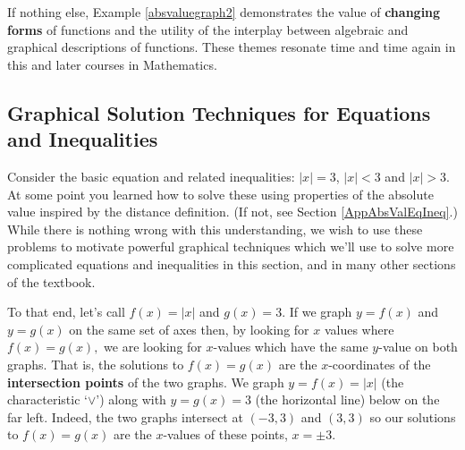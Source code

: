 \documentclass{ximera}
\begin{document}
If nothing else, Example \ref{absvaluegraph2} demonstrates the value of \textbf{changing forms} of functions and the utility of the interplay between algebraic and graphical descriptions of functions.  These themes resonate time and time again in this and later courses in Mathematics.  

\subsection{Graphical Solution Techniques for Equations and Inequalities}
\label{EquationsInequalitiesGraphically}

Consider the basic equation and related inequalities: $|x| = 3$, $|x| < 3$ and $|x| > 3$.  At some point you learned  how to solve these using properties of the absolute value inspired by the distance definition. (If not, see Section \ref{AppAbsValEqIneq}.)   While there is nothing wrong with this understanding, we wish to use these problems to motivate powerful graphical techniques which we'll use to solve more complicated equations and inequalities in this section, and in many other sections of the textbook.    

\medskip

To that end, let's call $f(x)  = |x|$ and $g(x) = 3$. If we graph $y = f(x)$ and $y = g(x)$ on the same set of axes then, by looking for $x$ values where $f(x) = g(x),$ we are looking for $x$-values which have the same $y$-value on both graphs. That is, the solutions to $f(x) = g(x)$ are the $x$-coordinates of the \textbf{intersection points} of the two graphs.  We graph $y = f(x) = |x|$ (the characteristic `$\vee$') along with $y = g(x) = 3$ (the horizontal line) below on the far left.  Indeed, the two graphs intersect at $(-3, 3)$ and $(3, 3)$ so our solutions to $f(x) = g(x)$ are the $x$-values of these points, $x = \pm 3$.    
\end{document}
